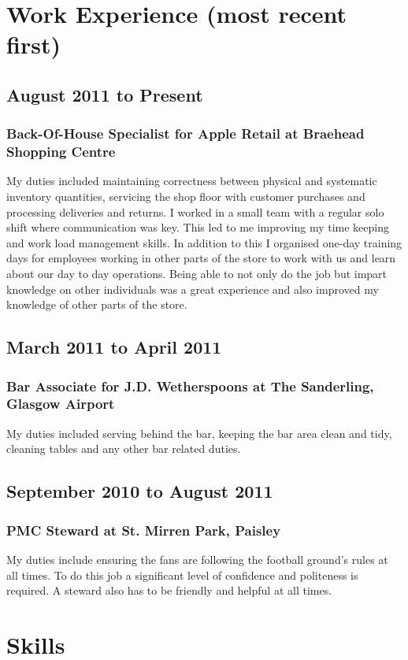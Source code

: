 \documentclass[10pt,a4paper]{article}
\begin{document}
\section*{Work Experience (most recent first)}
\subsection*{August 2011 to Present}
\subsubsection*{Back-Of-House Specialist for Apple Retail at Braehead 
Shopping Centre}
My duties included maintaining correctness between physical and systematic 
inventory quantities, servicing the shop floor with customer purchases and 
processing deliveries and returns. I worked in a small team with a regular 
solo shift where communication was key. This led to me improving my time 
keeping and work load management skills. In addition to this I organised 
one-day training days for employees working in other parts of the store to 
work with us and learn about our day to day operations. Being able to not 
only do the job but impart knowledge on other individuals was a great 
experience and also improved my knowledge of other parts of the store.
\subsection*{March 2011 to April 2011}
\subsubsection*{Bar Associate for J.D. Wetherspoons at The Sanderling, 
Glasgow Airport}
My duties included serving behind the bar, keeping the bar area clean and 
tidy, cleaning tables and any other bar related duties.
\subsection*{September 2010 to August 2011}
\subsubsection*{PMC Steward at St. Mirren Park, Paisley}
My duties include ensuring the fans are following the football ground's rules 
at all times. To do this job a significant level of confidence and politeness 
is required. A steward also has to be friendly and helpful at all times.
\section*{Skills}
\end{document}
